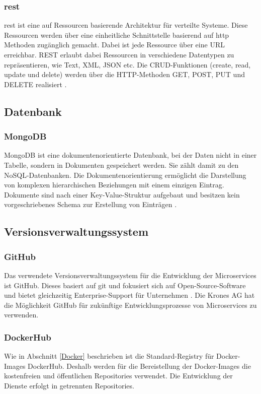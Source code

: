 \subsubsection{\ac{rest}}
\acs{rest} ist eine auf Ressourcen basierende Architektur für verteilte Systeme.
Diese Ressourcen werden über eine einheitliche Schnittstelle basierend auf 
\acs{http} Methoden zugänglich gemacht.
Dabei ist jede Ressource über eine URL erreichbar.
REST erlaubt dabei Ressourcen in verschiedene Datentypen zu repräsentieren, wie Text, XML, JSON etc.
Die CRUD-Funktionen (create, read, update und delete) werden über die HTTP-Methoden GET, POST, PUT und DELETE realisiert \cite{fundamentalsRestfulAPI}.
\subsection{Datenbank}

\subsubsection{MongoDB}

MongoDB ist eine dokumentenorientierte Datenbank, bei der Daten nicht in einer Tabelle, 
sondern in Dokumenten gespeichert werden.
Sie zählt damit zu den NoSQL-Datenbanken.
Die Dokumentenorientierung ermöglicht die Darstellung von komplexen hierarchischen Beziehungen mit einem einzigen Eintrag.
Dokumente sind nach einer Key-Value-Struktur aufgebaut und besitzen kein vorgeschriebenes Schema zur Erstellung von Einträgen \cite{mongodbdefinitive}.

\subsection{Versionsverwaltungssystem}
\subsubsection{GitHub}
Das verwendete Versionsverwaltungssystem für die Entwicklung der Microservices ist GitHub.
Dieses basiert auf git und fokusiert sich auf Open-Source-Software und bietet gleichzeitig Enterprise-Support für Unternehmen \cite{githubpricing}.
Die Krones AG hat die Möglichkeit GitHub für zukünftige Entwicklungsprozesse von Microservices zu verwenden.

\subsubsection{DockerHub}
Wie in Abschnitt \ref{Docker} beschrieben ist die Standard-Registry für Docker-Images DockerHub.
Deshalb werden für die Bereistellung der Docker-Images die kostenfreien und öffentlichen Repositories verwendet.
Die Entwicklung der Dienste erfolgt in getrennten Repositories.

